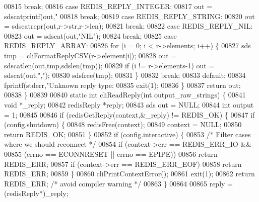 \begin{DoxyCode}
{{{{{{{{{{{{{{{{{{{{{{{{00815     \textcolor{keywordflow}{break};
00816     \textcolor{keywordflow}{case} REDIS\_REPLY\_INTEGER:
00817         out = sdscatprintf(out,\textcolor{stringliteral}{"%
00818     \textcolor{keywordflow}{break};
00819     \textcolor{keywordflow}{case} REDIS\_REPLY\_STRING:
00820         out = sdscatrepr(out,r->str,r->len);
00821     \textcolor{keywordflow}{break};
00822     \textcolor{keywordflow}{case} REDIS\_REPLY\_NIL:
00823         out = sdscat(out,\textcolor{stringliteral}{"NIL"});
00824     \textcolor{keywordflow}{break};
00825     \textcolor{keywordflow}{case} REDIS\_REPLY\_ARRAY:
00826         \textcolor{keywordflow}{for} (i = 0; i < r->elements; i++) \{
00827             sds tmp = cliFormatReplyCSV(r->element[i]);
00828             out = sdscatlen(out,tmp,sdslen(tmp));
00829             \textcolor{keywordflow}{if} (i != r->elements-1) out = sdscat(out,\textcolor{stringliteral}{","});
00830             sdsfree(tmp);
00831         \}
00832     \textcolor{keywordflow}{break};
00833     \textcolor{keywordflow}{default}:
00834         fprintf(stderr,\textcolor{stringliteral}{"Unknown reply type: %
00835         exit(1);
00836     \}
00837     \textcolor{keywordflow}{return} out;
00838 \}
00839 
00840 \textcolor{keyword}{static} \textcolor{keywordtype}{int} cliReadReply(\textcolor{keywordtype}{int} output\_raw\_strings) \{
00841     \textcolor{keywordtype}{void} *\_reply;
00842     redisReply *reply;
00843     sds out = NULL;
00844     \textcolor{keywordtype}{int} output = 1;
00845 
00846     \textcolor{keywordflow}{if} (redisGetReply(context,&\_reply) != REDIS\_OK) \{
00847         \textcolor{keywordflow}{if} (config.shutdown) \{
00848             redisFree(context);
00849             context = NULL;
00850             \textcolor{keywordflow}{return} REDIS\_OK;
00851         \}
00852         \textcolor{keywordflow}{if} (config.interactive) \{
00853             \textcolor{comment}{/* Filter cases where we should reconnect */}
00854             \textcolor{keywordflow}{if} (context->err == REDIS\_ERR\_IO &&
00855                 (errno == ECONNRESET || errno == EPIPE))
00856                 \textcolor{keywordflow}{return} REDIS\_ERR;
00857             \textcolor{keywordflow}{if} (context->err == REDIS\_ERR\_EOF)
00858                 \textcolor{keywordflow}{return} REDIS\_ERR;
00859         \}
00860         cliPrintContextError();
00861         exit(1);
00862         \textcolor{keywordflow}{return} REDIS\_ERR; \textcolor{comment}{/* avoid compiler warning */}
00863     \}
00864 
00865     reply = (redisReply*)\_reply;
}}}}}}}}}}}}}}}}}}}}}}}}}}
\end{DoxyCode}
